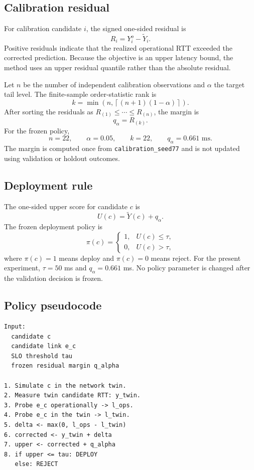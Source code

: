 \subsection{Calibration residual}

For calibration candidate $i$, the signed one-sided residual is
\[
R_i=Y^o_i-\widetilde{Y}_i.
\]
Positive residuals indicate that the realized operational RTT exceeded the corrected prediction. Because the objective is an upper latency bound, the method uses an upper residual quantile rather than the absolute residual.

Let $n$ be the number of independent calibration observations and $\alpha$ the target tail level. The finite-sample order-statistic rank is
\[
k=\min\left(n,\left\lceil(n+1)(1-\alpha)\right\rceil\right).
\]
After sorting the residuals as $R_{(1)}\le\cdots\le R_{(n)}$, the margin is
\[
q_\alpha=R_{(k)}.
\]
For the frozen policy,
\[
n=22,\qquad \alpha=0.05,\qquad k=22,\qquad q_\alpha=0.661\text{ ms}.
\]
The margin is computed once from \texttt{calibration\_seed77} and is not updated using validation or holdout outcomes.

\subsection{Deployment rule}

The one-sided upper score for candidate $c$ is
\[
U(c)=\widetilde{Y}(c)+q_\alpha.
\]
The frozen deployment policy is
\[
\pi(c)=
\begin{cases}
1,& U(c)\le\tau,\\
0,& U(c)>\tau,
\end{cases}
\]
where $\pi(c)=1$ means deploy and $\pi(c)=0$ means reject. For the present experiment, $\tau=50$ ms and $q_\alpha=0.661$ ms. No policy parameter is changed after the validation decision is frozen.

\subsection{Policy pseudocode}

{\footnotesize
\begin{verbatim}
Input:
  candidate c
  candidate link e_c
  SLO threshold tau
  frozen residual margin q_alpha

1. Simulate c in the network twin.
2. Measure twin candidate RTT: y_twin.
3. Probe e_c operationally -> l_ops.
4. Probe e_c in the twin -> l_twin.
5. delta <- max(0, l_ops - l_twin)
6. corrected <- y_twin + delta
7. upper <- corrected + q_alpha
8. if upper <= tau: DEPLOY
   else: REJECT
\end{verbatim}
}

